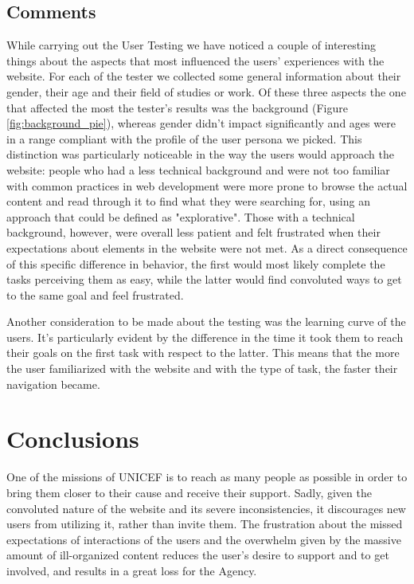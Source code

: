 \subsection{Comments}
While carrying out the User Testing we have noticed a couple of interesting things about the aspects that most influenced the users' experiences with the website. For each of the tester we collected some general information
about their gender, their age and their field of studies or work. Of these three aspects the one that affected the most the tester's results was the background (Figure \ref{fig:background_pie}), whereas gender didn't impact significantly and ages were in a range compliant with the profile of the user persona we picked.
This distinction was particularly noticeable in the way the users would approach the website: people who had a less technical background and were not too familiar with common practices in web development were more prone to browse the actual content and read through it to find what they were searching for, using an approach that could be defined as "explorative". Those with a technical background, however, were overall less patient and felt frustrated when their expectations about elements in the website were not met.
As a direct consequence of this specific difference in behavior, the first would most likely complete the tasks perceiving them as easy, while the latter would find convoluted ways to get to the same goal and feel frustrated.

Another consideration to be made about the testing was the learning curve of the users. It's particularly evident by the difference in the time it took them to reach their goals on the first task with respect to the latter.
This means that the more the user familiarized with the website and with the type of task, the faster their navigation became.

\section{Conclusions}
One of the missions of UNICEF is to reach as many people as possible in order to bring them closer to their cause and receive their support. Sadly, given the convoluted nature of the website and its severe inconsistencies, it discourages new users from utilizing it, rather than invite them.
The frustration about the missed expectations of interactions of the users and the overwhelm given by the massive amount of ill-organized content reduces the user's desire to support and to get involved, and results in a great loss for the Agency.
